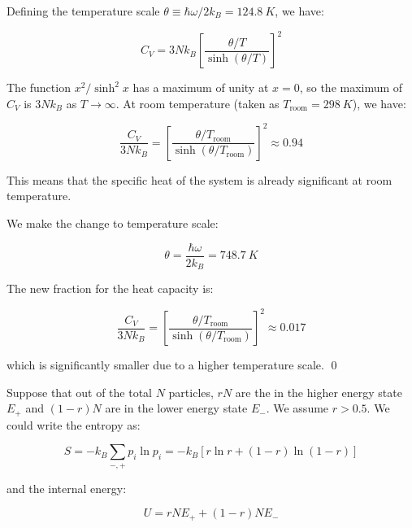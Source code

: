 \documentclass[12pt]{article}
\begin{document}
Defining the temperature scale $\theta \equiv \hbar \omega / 2k_{B} = \qty{124.8}{K}$, we have:

\begin{equation}
    C_{V} = 3N k_{B} \left[ \frac{\theta/T}{\sinh\left( \theta/T \right)} \right]^{2}
\end{equation}

The function $x^{2}/\sinh^{2}{x}$ has a maximum of unity at $x = 0$, so the maximum of $C_{V}$ is $3Nk_{B}$ as $T \to \infty$. At room temperature (taken as $T_{\text{room}} = \qty{298}{K}$), we have:

\begin{equation}
    \frac{C_{V}}{3Nk_{B}} = \left[ \frac{\theta/T_{\text{room}}}{\sinh\left( \theta/T_{\text{room}} \right)} \right]^{2} \approx 0.94
\end{equation}

This means that the specific heat of the system is already significant at room temperature.

We make the change to temperature scale:

\begin{equation}
    \theta = \frac{\hbar \omega}{2k_{B}} = \qty{748.7}{K}
\end{equation}

The new fraction for the heat capacity is:

\begin{equation}
    \frac{C_{V}}{3Nk_{B}} = \left[ \frac{\theta/T_{\text{room}}}{\sinh\left( \theta/T_{\text{room}} \right)} \right]^{2} \approx 0.017
\end{equation}

which is significantly smaller due to a higher temperature scale.
\qed



Suppose that out of the total $N$ particles, $rN$ are the in the higher energy state $E_{+}$ and $(1-r)N$ are in the lower energy state $E_{-}$. We assume $r > 0.5$. We could write the entropy as:

\begin{equation}
    S = -k_{B} \sum_{-, +} p_{i} \ln{p_{i}} = -k_{B} \left[ r \ln{r} + (1-r) \ln{(1-r)} \right]
\end{equation}

and the internal energy:

\begin{equation}
    U = rN E_{+} + (1-r)N E_{-}
\end{equation}
\end{document}
